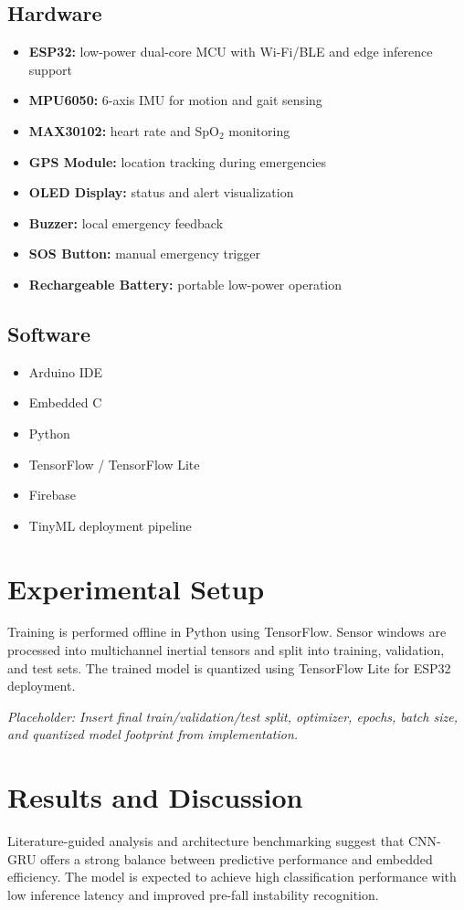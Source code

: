 \documentclass[conference]{IEEEtran}
\begin{document}
\subsection{Hardware}
\begin{itemize}[leftmargin=*]
\item \textbf{ESP32:} low-power dual-core MCU with Wi-Fi/BLE and edge inference support
\item \textbf{MPU6050:} 6-axis IMU for motion and gait sensing
\item \textbf{MAX30102:} heart rate and SpO$_2$ monitoring
\item \textbf{GPS Module:} location tracking during emergencies
\item \textbf{OLED Display:} status and alert visualization
\item \textbf{Buzzer:} local emergency feedback
\item \textbf{SOS Button:} manual emergency trigger
\item \textbf{Rechargeable Battery:} portable low-power operation
\end{itemize}

\subsection{Software}
\begin{itemize}[leftmargin=*]
\item Arduino IDE
\item Embedded C
\item Python
\item TensorFlow / TensorFlow Lite
\item Firebase
\item TinyML deployment pipeline
\end{itemize}

\section{Experimental Setup}
Training is performed offline in Python using TensorFlow. Sensor windows are processed into multichannel inertial tensors and split into training, validation, and test sets. The trained model is quantized using TensorFlow Lite for ESP32 deployment.

\textit{Placeholder: Insert final train/validation/test split, optimizer, epochs, batch size, and quantized model footprint from implementation.}

\section{Results and Discussion}
Literature-guided analysis and architecture benchmarking suggest that CNN-GRU offers a strong balance between predictive performance and embedded efficiency. The model is expected to achieve high classification performance with low inference latency and improved pre-fall instability recognition.
\end{document}
